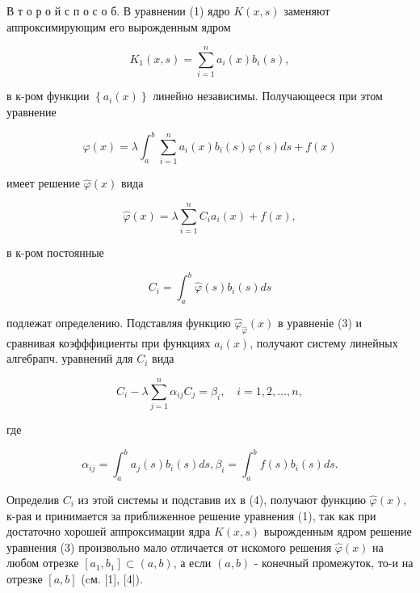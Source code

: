 \documentclass[10pt]{article}
\begin{document}
В т о р о й с п о с о б. В уравнении (1) ядро $K(x, s)$ заменяют аппроксимирующим его вырожденным ядром



\[

K_{1}(x, s)=\sum_{i=1}^{n} a_{i}(x) b_{i}(s),

\]



в к-ром функции $\left\{a_{i}(x)\right\}$ линейно независимы. Получающееся при этом уравнение



\[

\varphi(x)=\lambda \int_{a}^{b} \sum_{i=1}^{n} a_{i}(x) b_{i}(s) \varphi(s) d s+f(x)

\]



имеет решение $\hat{\varphi}(x)$ вида



\[

\hat{\varphi}(x)=\lambda \sum_{i=1}^{n} C_{i} a_{i}(x)+f(x),

\]



в к-ром постоянные



\[

C_{i}=\int_{a}^{b} \hat{\varphi}(s) b_{i}(s) d s

\]



подлежат определению. Подставляя функцию $\hat{\varphi}_{\hat{\varphi}}(x)$ в уравненіе (3) и сравнивая коэфффициенты при функциях $a_{i}(x)$, получают систему линейных алгебрапч. уравнений для $C_{i}$ вида



\[

C_{i}-\lambda \sum_{j=1}^{n} \alpha_{i j} C_{j}=\beta_{i}, \quad i=1,2, \ldots, n,

\]



где



\[

\alpha_{i j}=\int_{a}^{b} a_{j}(s) b_{i}(s) d s, \beta_{i}=\int_{a}^{b} f(s) b_{i}(s) d s .

\]



Определив $C_{i}$ из этой системы и подставив их в (4), получают функцию $\hat{\varphi}(x)$, к-рая и принимается за приближенное решение уравнения (1), так как при достаточно хорошей аппроксимации ядра $K(x, s)$ вырожденным ядром решение уравнения (3) произвольно мало отличается от искомого решения $\hat{\varphi}(x)$ на любом отрезке $\left[a_{1}, b_{1}\right] \subset(a, b)$, а если $(a, b)$ - конечный промежуток, то-и на отрезке $[a, b]$ (cм. [1], [4]).
\end{document}
